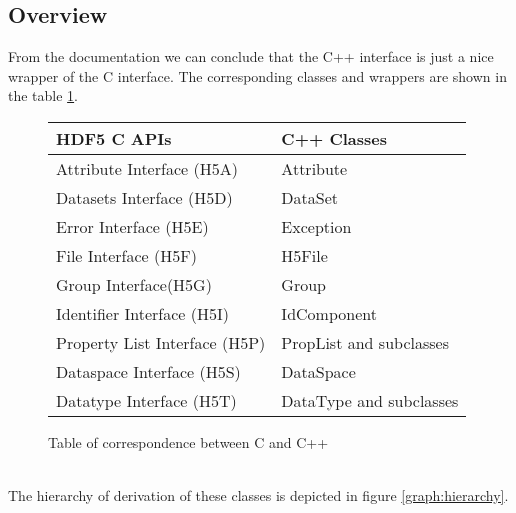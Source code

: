 \documentclass{article}
\begin{document}
\subsection{Overview}
From the documentation we can conclude that the C++ interface is just a nice wrapper of the C interface. The corresponding classes and wrappers are shown in the table \ref{table:corrs}.\\
\begin{figure}[!h]
\centering
\begin{tabular}{|l|l|}
\hline
HDF5 C APIs&C++ Classes\\
\hline
Attribute Interface (H5A)&Attribute\\
Datasets Interface (H5D)&DataSet\\
Error Interface (H5E)&Exception\\
File Interface (H5F)&H5File\\
Group Interface(H5G)&Group\\
Identifier Interface (H5I)&IdComponent\\
Property List Interface (H5P)&PropList and subclasses\\
Dataspace Interface (H5S)&DataSpace\\
Datatype Interface (H5T)&DataType and subclasses\\
\hline
\end{tabular}
\caption{Table of correspondence between C and C++}
\label{table:corrs}
\end{figure}\\
The hierarchy of derivation of these classes is depicted in figure \ref{graph:hierarchy}.
\end{document}

